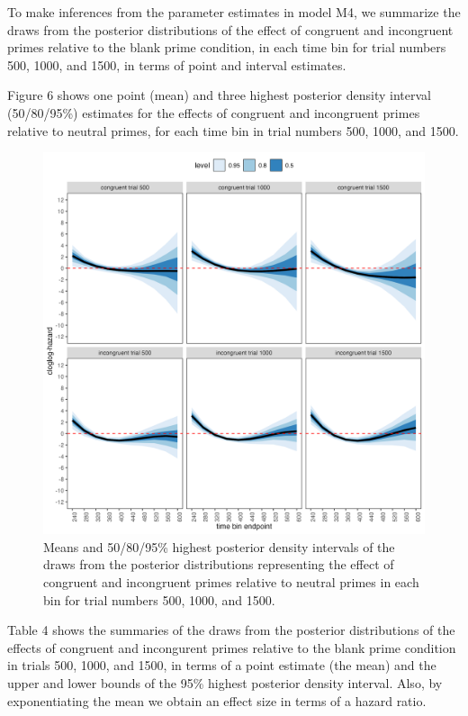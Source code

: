 \documentclass[
  man,floatsintext]{apa6}
\begin{document}
To make inferences from the parameter estimates in model M4, we summarize the draws from the posterior distributions of the effect of congruent and incongruent primes relative to the blank prime condition, in each time bin for trial numbers 500, 1000, and 1500, in terms of point and interval estimates.

Figure 6 shows one point (mean) and three highest posterior density interval (50/80/95\%) estimates for the effects of congruent and incongruent primes relative to neutral primes, for each time bin in trial numbers 500, 1000, and 1500.



\begin{figure}[H]

{\centering \includegraphics[width=0.8\linewidth,height=0.67\textheight,]{../Tutorial_2_Bayesian/figures/M4effects_con_incon_3trials} 

}

\caption{Means and 50/80/95\% highest posterior density intervals of the draws from the posterior distributions representing the effect of congruent and incongruent primes relative to neutral primes in each bin for trial numbers 500, 1000, and 1500.}\label{fig:plot-prime-effects}
\end{figure}

Table 4 shows the summaries of the draws from the posterior distributions of the effects of congruent and incongurent primes relative to the blank prime condition in trials 500, 1000, and 1500, in terms of a point estimate (the mean) and the upper and lower bounds of the 95\% highest posterior density interval. Also, by exponentiating the mean we obtain an effect size in terms of a hazard ratio.
\end{document}
